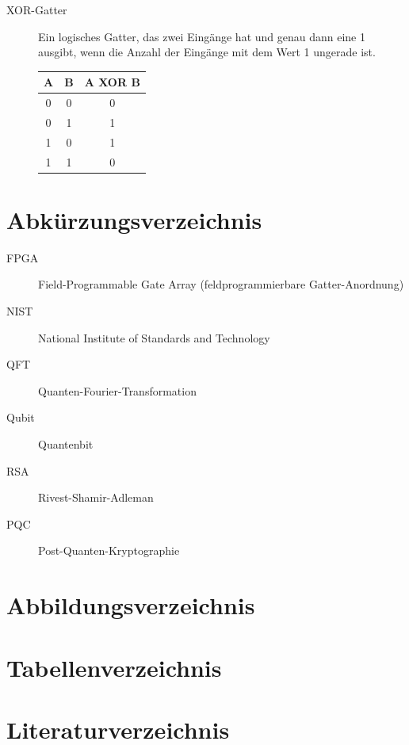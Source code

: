 \begin{description}
    \item[\hypertarget{xor-gate-def}{}XOR-Gatter] 
    Ein logisches Gatter, das zwei Eingänge hat und genau dann eine 1 ausgibt, wenn die Anzahl der Eingänge mit dem Wert 1 ungerade ist.
    
    \begin{center}
    \begin{tabular}{|c|c|c|}
    \hline
    A & B & A XOR B \\
    \hline
    0 & 0 & 0 \\
    \hline
    0 & 1 & 1 \\
    \hline
    1 & 0 & 1 \\
    \hline
    1 & 1 & 0 \\
    \hline
    \end{tabular}
    \end{center}

\end{description}
\pagebreak
\section{Abkürzungsverzeichnis}
\begin{description}
    \item[FPGA] Field-Programmable Gate Array (feldprogrammierbare Gatter-Anordnung)
    \item[NIST] National Institute of Standards and Technology
    \item[QFT] Quanten-Fourier-Transformation
    \item[Qubit] Quantenbit
    \item[RSA] Rivest-Shamir-Adleman
    \item[PQC] Post-Quanten-Kryptographie
\end{description}

\section{Abbildungsverzeichnis}
\listoffigures

\section{Tabellenverzeichnis}
\listoftables
\pagebreak
\section{Literaturverzeichnis}
\printbibliography[heading=none]

